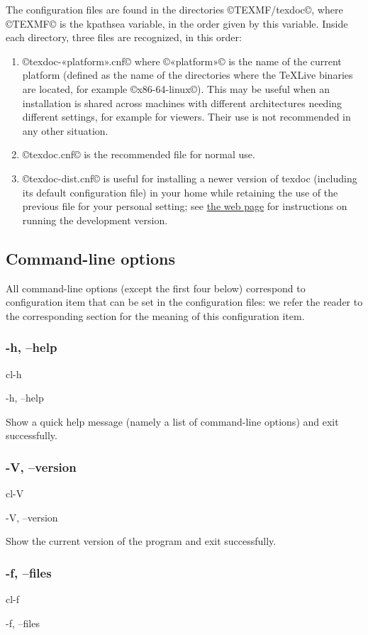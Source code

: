 \documentclass[a4paper, oneside]{scrartcl}
\newcommand\texlive{%
  \TeX\thinspace Live\xspace}
\newif\ifframed
\newenvironment{cmdsubsub}[2]{%
  \framedfalse \commandes\subsubsection{#1}{#2}%
  }{%
  \endcommandes}
\begin{document}
The configuration files are found in the directories ©TEXMF/texdoc©, where
©TEXMF© is the kpathsea variable, in the order given by this variable. Inside
each directory, three files are recognized, in this order:
\begin{enumerate}
  \item ©texdoc-«platform».cnf© where ©«platform»© is the name of the current
    platform (defined as the name of the directories where the \texlive
    binaries are located, for example ©x86-64-linux©). This may be useful when
    an installation is shared across machines with different architectures
    needing different settings, for example for viewers. Their use is not
    recommended in any other situation.
  \item ©texdoc.cnf© is the recommended file for normal use.
  \item ©texdoc-dist.cnf© is useful for installing a newer version of texdoc
    (including its default configuration file) in your home while retaining
    the use of the previous file for your personal setting;  see
    \href{http://tug.org/texdoc/dev/}{the web page} for instructions on
    running the development version.
\end{enumerate}

\subsection{Command-line options}\label{ss-cl}

All command-line options (except the first four below) correspond to
configuration item that can be set in the configuration files: we refer
the reader to the corresponding section for the meaning of this configuration
item.

\begin{cmdsubsub}{-h, --help}{cl-h}
  -h, --help
\end{cmdsubsub}

Show a quick help message (namely a list of command-line options) and exit
successfully.

\begin{cmdsubsub}{-V, --version}{cl-V}
  -V, --version
\end{cmdsubsub}

Show the current version of the program and exit successfully.

\begin{cmdsubsub}{-f, --files}{cl-f}
  -f, --files
\end{cmdsubsub}
\end{document}
